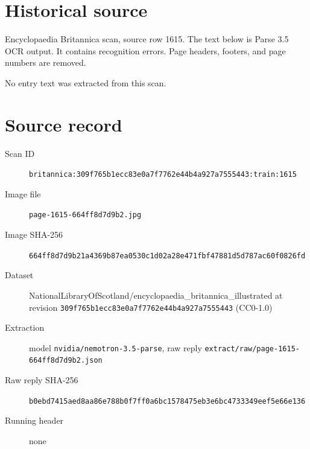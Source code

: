 \documentclass{article}
\begin{document}
\section*{Historical source}
Encyclopaedia Britannica scan, source row 1615. The text below is Parse 3.5 OCR output. It contains recognition errors.
Page headers, footers, and page numbers are removed.

No entry text was extracted from this scan.

\section*{Source record}
\begin{description}
\item[Scan ID] \texttt{britannica:309f765b1ecc83e0a7f7762e44b4a927a7555443:train:1615}
\item[Image file] \texttt{page-1615-664ff8d7d9b2.jpg}
\item[Image SHA-256] \texttt{664ff8d7d9b21a4369b87ea0530c1d02a28e471fbf47881d5d787ac60f0826fd}
\item[Dataset] NationalLibraryOfScotland/encyclopaedia\_britannica\_illustrated at revision \texttt{309f765b1ecc83e0a7f7762e44b4a927a7555443} (CC0-1.0)
\item[Extraction] model \texttt{nvidia/nemotron-3.5-parse}, raw reply \texttt{extract/raw/page-1615-664ff8d7d9b2.json}
\item[Raw reply SHA-256] \texttt{b0ebd7415aed8aa86e788b0f7ff0a6bc1578475eb3e6bc4733349eef5e66e136}

\item[Running header] none
\end{description}
\end{document}
